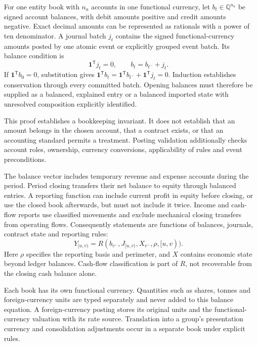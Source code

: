 For one entity book with $n_a$ accounts in one functional currency, let
$b_t\in\mathbb{Q}^{n_a}$ be
signed account balances, with debit amounts positive and credit amounts
negative. Exact decimal amounts can be represented as rationals with a power
of ten denominator. A journal batch $j_t$ contains the signed functional-currency
amounts posted by one atomic event or explicitly grouped event batch. Its
balance condition is
\begin{equation}\label{eq:posting}
 \boldsymbol{1}^{\mathsf T}j_t=0,\qquad b_t=b_{t^-}+j_t.
\end{equation}
If $\boldsymbol{1}^{\mathsf T}b_0=0$, substitution gives
$\boldsymbol{1}^{\mathsf T}b_t=
\boldsymbol{1}^{\mathsf T}b_{t^-}+\boldsymbol{1}^{\mathsf T}j_t=0$.
Induction establishes conservation through every committed batch. Opening
balances must therefore be supplied as a balanced, explained entry or a
balanced imported state with unresolved composition explicitly identified.

This proof establishes a bookkeeping invariant. It does not establish that an
amount belongs in the chosen account, that a contract exists, or that an
accounting standard permits a treatment. Posting validation additionally
checks account roles, ownership, currency conversions, applicability of rules
and event preconditions.

The balance vector includes temporary revenue and expense accounts during
the period. Period closing transfers their net balance to equity through
balanced entries. A reporting function can include current profit in equity
before closing, or use the closed book afterwards, but must not include it
twice. Income and cash-flow reports use classified movements and exclude
mechanical closing transfers from operating flows. Consequently statements
are functions of balances, journals, contract state and reporting rules:
\begin{equation}\label{eq:report}
 Y_{[u,v)}=R(b_{v^-},J_{[u,v)},X_{v^-},\rho,[u,v)).
\end{equation}
Here $\rho$ specifies the reporting basis and perimeter, and $X$ contains
economic state beyond ledger balances. Cash-flow classification is part of
$R$, not recoverable from the closing cash balance alone.

Each book has its own functional currency. Quantities such as shares, tonnes
and foreign-currency units are typed separately and never added to this
balance equation. A foreign-currency posting stores its original units and
the functional-currency valuation with its rate source. Translation into a
group's presentation currency and consolidation adjustments occur in a
separate book under explicit rules.

